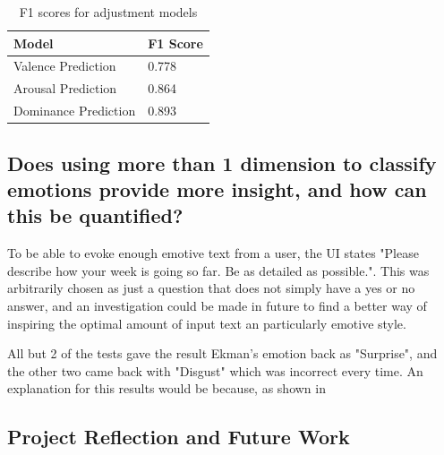 \begin{table}[h]
\centering
\caption{F1 scores for adjustment models}
\begin{tabular}{|l|l|}
\hline
Model & F1 Score \\ \hline
 Valence Prediction &  0.778\\
 Arousal Prediction &  0.864\\
 Dominance Prediction &  0.893\\
 \hline
\end{tabular}
\label{f1:adj}
\end{table}

\subsection{Does using more than 1 dimension to classify emotions provide more insight, and how can this be quantified?}



To be able to evoke enough emotive text from a user, the UI states "Please describe how your week is going so far. Be as detailed as possible.". This was arbitrarily chosen as just a question that does not simply have a yes or no answer, and an investigation could be made in future to find a better way of inspiring the optimal amount of input text an particularly emotive style.

All but 2 of the tests gave the result Ekman's emotion back as "Surprise", and the other two came back with "Disgust" which was incorrect every time. An explanation for this results would be because, as shown in 


\subsection{Project Reflection and Future Work}

